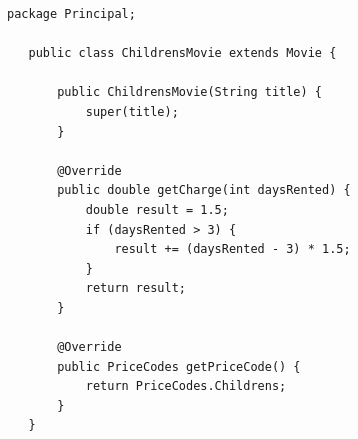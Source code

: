\begin{lstlisting}[caption={ChildrensMovie.java}]
   package Principal;

   public class ChildrensMovie extends Movie {
       
       public ChildrensMovie(String title) {
           super(title);
       }
       
       @Override
       public double getCharge(int daysRented) {
           double result = 1.5;
           if (daysRented > 3) {
               result += (daysRented - 3) * 1.5;
           }
           return result;
       }
       
       @Override
       public PriceCodes getPriceCode() {
           return PriceCodes.Childrens;
       }
   }
\end{lstlisting}
